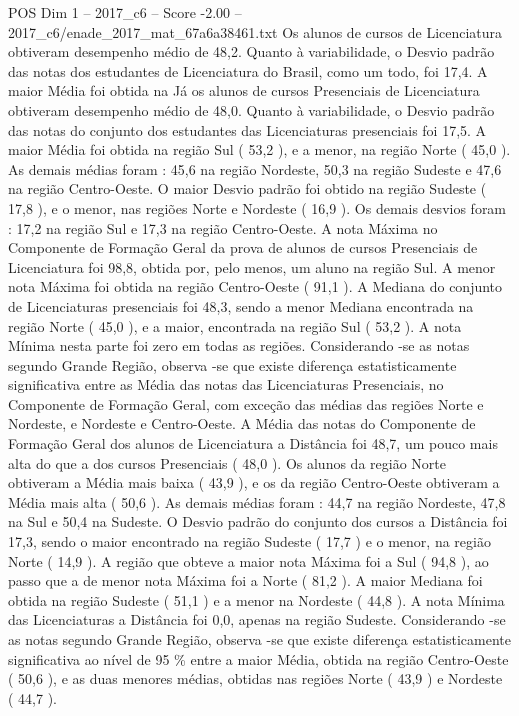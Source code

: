 \begin{textsample}{POS Dim 1 – 2017\_c6 – Score -2.00 – 2017\_c6/enade\_2017\_mat\_67a6a38461.txt}
Os alunos de cursos de Licenciatura obtiveram desempenho médio de 48,2.
Quanto à variabilidade, o Desvio padrão das notas dos estudantes de Licenciatura do Brasil, como um todo, foi 17,4.
A maior Média foi obtida na Já os alunos de cursos Presenciais de Licenciatura obtiveram desempenho médio de 48,0.
Quanto à variabilidade, o Desvio padrão das notas do conjunto dos estudantes das Licenciaturas presenciais foi 17,5.
A maior Média foi obtida na região Sul ( 53,2 ), e a menor, na região Norte ( 45,0 ).
As demais médias foram : 45,6 na região Nordeste, 50,3 na região Sudeste e 47,6 na região Centro-Oeste.
O maior Desvio padrão foi obtido na região Sudeste ( 17,8 ), e o menor, nas regiões Norte e Nordeste ( 16,9 ).
Os demais desvios foram : 17,2 na região Sul e 17,3 na região Centro-Oeste.
A nota Máxima no Componente de Formação Geral da prova de alunos de cursos Presenciais de Licenciatura foi 98,8, obtida por, pelo menos, um aluno na região Sul.
A menor nota Máxima foi obtida na região Centro-Oeste ( 91,1 ).
A Mediana do conjunto de Licenciaturas presenciais foi 48,3, sendo a menor Mediana encontrada na região Norte ( 45,0 ), e a maior, encontrada na região Sul ( 53,2 ).
A nota Mínima nesta parte foi zero em todas as regiões.
Considerando -se as notas segundo Grande Região, observa -se que existe diferença estatisticamente significativa entre as Média das notas das Licenciaturas Presenciais, no Componente de Formação Geral, com exceção das médias das regiões Norte e Nordeste, e Nordeste e Centro-Oeste.
A Média das notas do Componente de Formação Geral dos alunos de Licenciatura a Distância foi 48,7, um pouco mais alta do que a dos cursos Presenciais ( 48,0 ).
Os alunos da região Norte obtiveram a Média mais baixa ( 43,9 ), e os da região Centro-Oeste obtiveram a Média mais alta ( 50,6 ).
As demais médias foram : 44,7 na região Nordeste, 47,8 na Sul e 50,4 na Sudeste.
O Desvio padrão do conjunto dos cursos a Distância foi 17,3, sendo o maior encontrado na região Sudeste ( 17,7 ) e o menor, na região Norte ( 14,9 ).
A região que obteve a maior nota Máxima foi a Sul ( 94,8 ), ao passo que a de menor nota Máxima foi a Norte ( 81,2 ).
A maior Mediana foi obtida na região Sudeste ( 51,1 ) e a menor na Nordeste ( 44,8 ).
A nota Mínima das Licenciaturas a Distância foi 0,0, apenas na região Sudeste.
Considerando -se as notas segundo Grande Região, observa -se que existe diferença estatisticamente significativa ao nível de 95 \% entre a maior Média, obtida na região Centro-Oeste ( 50,6 ), e as duas menores médias, obtidas nas regiões Norte ( 43,9 ) e Nordeste ( 44,7 ).

\end{textsample}
